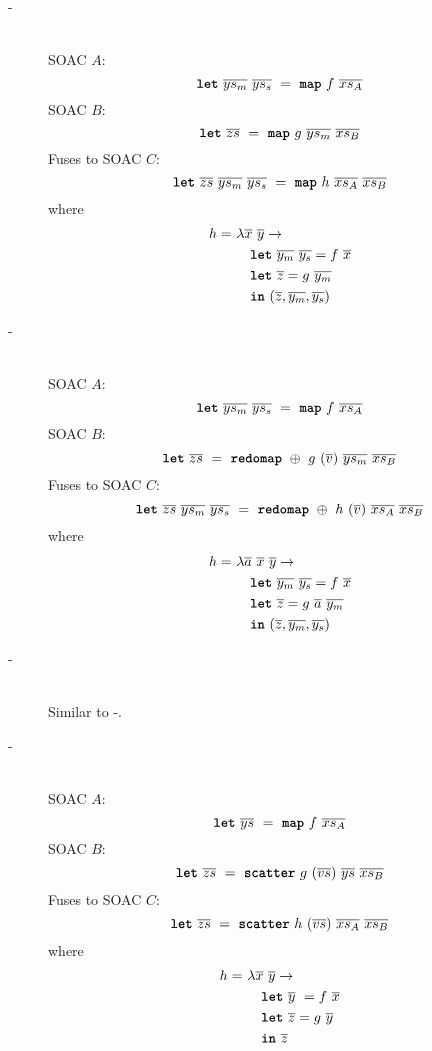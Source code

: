 \begin{description}
\item[-]\hfill\\
  SOAC $A$:
  \[
    \kw{let}~\seq{ys_{m}}~\seq{ys_{s}}~=~\kw{map}~f~\seq{xs_{A}}
  \]
  SOAC $B$:
  \[
    \kw{let}~\seq{zs}~=~\kw{map}~g~\seq{ys_{m}}~\seq{xs_{B}}
  \]
  Fuses to SOAC $C$:
  \[
    \kw{let}~\seq{zs}~\seq{ys_{m}}~\seq{ys_{s}}~=~\kw{map}~h~\seq{xs_{A}}~\seq{xs_{B}}
  \]
  where
  \begin{align*}
    h =~& \fn \seq{x}~\seq{y} \rightarrow \\
      & \quad \kw{let}~\seq{y_{m}}~\seq{y_{s}} = f~\seq{x} \\
      & \quad \kw{let}~\seq{z} = g~\seq{y_{m}} \\
      & \quad \kw{in}~(\seq{z}, \seq{y_{m}}, \seq{y_{s}})
  \end{align*}

\item[-]\hfill\\
  SOAC $A$:
  \[
    \kw{let}~\seq{ys_{m}}~\seq{ys_{s}}~=~\kw{map}~f~\seq{xs_{A}}
  \]
  SOAC $B$:
  \[
    \kw{let}~\seq{zs}~=~\kw{redomap}~\oplus~g~(\seq{v})~\seq{ys_{m}}~\seq{xs_{B}}
  \]
  Fuses to SOAC $C$:
  \[
    \kw{let}~\seq{zs}~\seq{ys_{m}}~\seq{ys_{s}}~=~\kw{redomap}~\oplus~h~(\seq{v})~\seq{xs_{A}}~\seq{xs_{B}}
  \]
  where
  \begin{align*}
    h =~& \fn \seq{a}~\seq{x}~\seq{y} \rightarrow \\
      & \quad \kw{let}~\seq{y_{m}}~\seq{y_{s}} = f~\seq{x} \\
      & \quad \kw{let}~\seq{z} = g~\seq{a}~\seq{y_{m}} \\
      & \quad \kw{in}~(\seq{z}, \seq{y_{m}}, \seq{y_{s}})
  \end{align*}

\item[-]\hfill\\

  Similar to -.

\item[-]\hfill\\

  SOAC $A$:
  \[
    \kw{let}~\seq{ys}~=~\kw{map}~f~\seq{xs_{A}}
  \]
  SOAC $B$:
  \[
    \kw{let}~\seq{zs}~=~\kw{scatter}~g~(\seq{vs})~\seq{ys}~\seq{xs_{B}}
  \]
  Fuses to SOAC $C$:
  \[
    \kw{let}~\seq{zs}~=~\kw{scatter}~h~(\seq{vs})~\seq{xs_{A}}~\seq{xs_{B}}
  \]
  where
  \begin{align*}
    h =~& \fn \seq{x}~\seq{y} \rightarrow \\
      & \quad \kw{let}~\seq{y}~ = f~\seq{x} \\
      & \quad \kw{let}~\seq{z} = g~\seq{y} \\
      & \quad \kw{in}~\seq{z}
  \end{align*}


\end{description}
